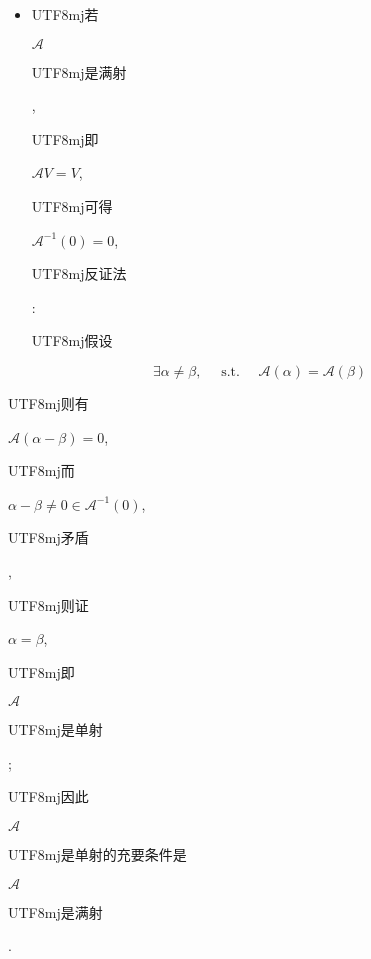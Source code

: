 \documentclass[10pt]{article}
\begin{document}
\begin{itemize}
  \item \begin{CJK}{UTF8}{mj}若\end{CJK} $\mathscr{A}$ \begin{CJK}{UTF8}{mj}是满射\end{CJK}, \begin{CJK}{UTF8}{mj}即\end{CJK} $\mathscr{A} V=V$, \begin{CJK}{UTF8}{mj}可得\end{CJK} $\mathscr{A}^{-1}(0)=0$, \begin{CJK}{UTF8}{mj}反证法\end{CJK}: \begin{CJK}{UTF8}{mj}假设\end{CJK}
\end{itemize}
$$
\exists \alpha \neq \beta, \quad \text { s.t. } \quad \mathscr{A}(\alpha)=\mathscr{A}(\beta)
$$
\begin{CJK}{UTF8}{mj}则有\end{CJK} $\mathscr{A}(\alpha-\beta)=0$, \begin{CJK}{UTF8}{mj}而\end{CJK} $\alpha-\beta \neq 0 \in \mathscr{A}^{-1}(0)$, \begin{CJK}{UTF8}{mj}矛盾\end{CJK}, \begin{CJK}{UTF8}{mj}则证\end{CJK} $\alpha=\beta$, \begin{CJK}{UTF8}{mj}即\end{CJK} $\mathscr{A}$ \begin{CJK}{UTF8}{mj}是单射\end{CJK};

\begin{CJK}{UTF8}{mj}因此\end{CJK} $\mathscr{A}$ \begin{CJK}{UTF8}{mj}是单射的充要条件是\end{CJK} $\mathscr{A}$ \begin{CJK}{UTF8}{mj}是满射\end{CJK}.
\end{document}
